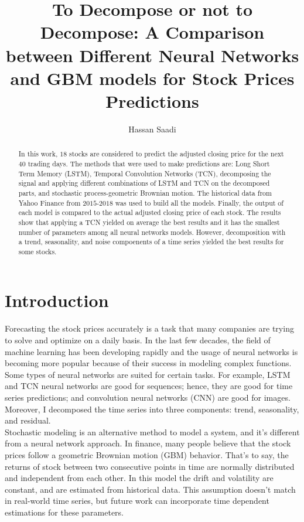 \documentclass[12pt, A4]{article}
\title{To Decompose or not to Decompose: A Comparison between Different Neural Networks and GBM models for Stock Prices Predictions}
\author{Hassan Saadi}
\begin{document}
	\date{}
	\maketitle
\begin{abstract}
	In this work, $18$ stocks are considered to predict the adjusted closing price for the next $40$ trading days. The methods that were used to make predictions are: Long Short Term Memory (LSTM), Temporal Convolution Networks (TCN), decomposing the signal and applying different combinations of LSTM and TCN on the decomposed parts, and stochastic process-geometric Brownian motion. The historical data from Yahoo Finance from $2015$-$2018$ was used to build all the models. Finally, the output of each model is compared to the actual adjusted closing price of each stock. The results show that applying a TCN yielded on average the best results and it has the smallest number of parameters among all neural networks models. However, decomposition with a trend, seasonality, and noise compoenents of a time series yielded the best results for some stocks. 

\end{abstract}

\section{Introduction}
Forecasting the stock prices accurately is a task that many companies are trying to solve and optimize on a daily basis. In the last few decades, the field of machine learning has been developing rapidly and the usage of neural networks is becoming more popular because of their success in modeling complex functions. Some types of neural networks are suited for certain tasks. For example, LSTM and TCN neural networks are good for sequences; hence, they are good for time series predictions; and convolution neural networks (CNN) are good for images. Moreover, I decomposed the time series into three components: trend, seasonality, and residual. \\

Stochastic modeling is an alternative method to model a system, and it's different from a neural network approach. In finance, many people believe that the stock prices follow a geometric Brownian motion (GBM) behavior. That's to say, the returns of stock between two consecutive points in time are normally distributed and independent from each other. In this model the drift and volatility are constant, and are estimated from historical data. This assumption doesn't match in real-world time series, but future work can incorporate time dependent estimations for these parameters.\\
\end{document}
